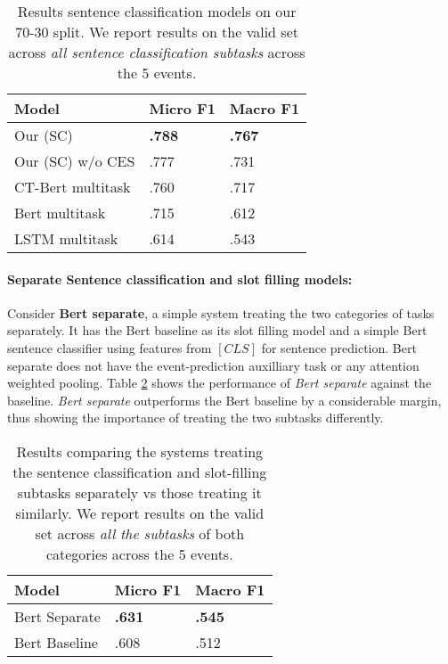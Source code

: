 \documentclass[11pt,a4paper]{article}
\begin{document}
\begin{table}
 \begin{center}
  \begin{tabular}{p{3cm}p{1.5cm}p{1.5cm}}
    \hline
    Model & Micro F1 & Macro F1\\ 
    \hline
    Our (SC) & \textbf{.788} & \textbf{.767} \\
    Our (SC) w/o CES & .777 & .731\\
    CT-Bert multitask & .760 & .717 \\
    Bert multitask & .715 & .612\\
    LSTM multitask & .614 & .543\\
    \hline

  \end{tabular}
  \caption{\label{Table5:} Results sentence classification models on our 70-30 split. We report results on the valid set across \textit{all sentence classification subtasks} across the 5 events.}
 \end{center}
\end{table}

\paragraph{Separate Sentence classification and slot filling models:} Consider \textbf{Bert separate}, a simple system treating the two categories of tasks separately. It has the Bert baseline as its slot filling model and a simple Bert sentence classifier using features from $[CLS]$ for sentence prediction. Bert separate does not have the event-prediction auxilliary task or any attention weighted pooling. Table \ref{Table6:} shows the performance of \textit{Bert separate} against the baseline. \textit{Bert separate} outperforms the Bert baseline by a considerable margin, thus showing the importance of treating the two subtasks differently.

\begin{table}
 \begin{center}
  \begin{tabular}{p{3cm}p{1.5cm}p{1.5cm}}
    \hline
    Model & Micro F1 & Macro F1\\ 
    \hline
    Bert Separate & \textbf{.631} & \textbf{.545}\\
    Bert Baseline & .608 & .512\\
    \hline

  \end{tabular}
  \caption{\label{Table6:} Results comparing the systems treating the sentence classification and slot-filling subtasks separately vs those treating it similarly. We report results on the valid set across \textit{all the subtasks} of both categories across the 5 events.}
 \end{center}
\end{table}
\end{document}
